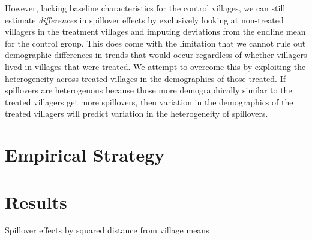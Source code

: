 \documentclass[11pt]{article}
\begin{document}
However, lacking baseline characteristics for the control villages, we can still estimate \textit{differences} in spillover effects by exclusively looking at non-treated villagers in the treatment villages and imputing deviations from the endline mean for the control group. This does come with the limitation that we cannot rule out demographic differences in trends that would occur regardless of whether villagers lived in villages that were treated. We attempt to overcome this by exploiting the heterogeneity across treated villages in the demographics of those treated. If spillovers are heterogenous because those more demographically similar to the treated villagers get more spillovers, then variation in the demographics of the treated villagers will predict variation in the heterogeneity of spillovers.

\section{Empirical Strategy}

\section{Results}

\begin{table}
\centering
\caption{Spillover effects by squared distance from village means}
\end{table}
\end{document}
